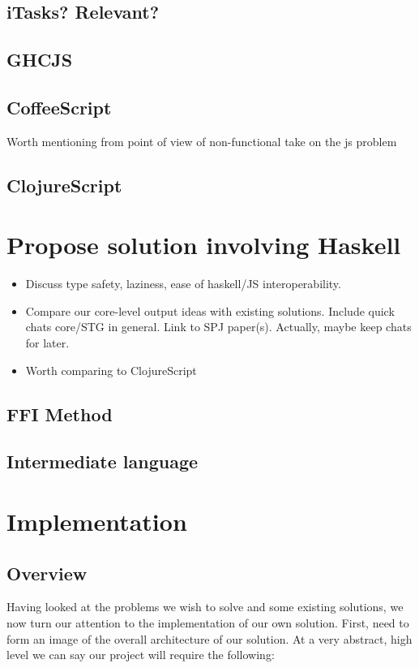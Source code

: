 \documentclass[11pt]{article}
\begin{document}
\subsection{iTasks? Relevant?}

\subsection{GHCJS}

\subsection{CoffeeScript}
Worth mentioning from point of view of non-functional take on the js problem

\subsection{ClojureScript}



\section{Propose solution involving Haskell}
\begin{itemize}
\item Discuss type safety, laziness, ease of haskell/JS interoperability.
\item Compare our core-level output ideas with existing solutions. Include quick chats
	  core/STG in general. Link to SPJ paper(s). Actually, maybe keep chats for later.
\item Worth comparing to ClojureScript 
\end{itemize}

\subsection{FFI Method}

\subsection{Intermediate language}

\pagebreak

\section{Implementation}
\subsection{Overview}
Having looked at the problems we wish to solve and some existing solutions, we now turn our attention to the implementation of our own solution. First,
need to form an image of the overall architecture of our solution. At a
very abstract, high level we can say our project will require the following:
\end{document}
